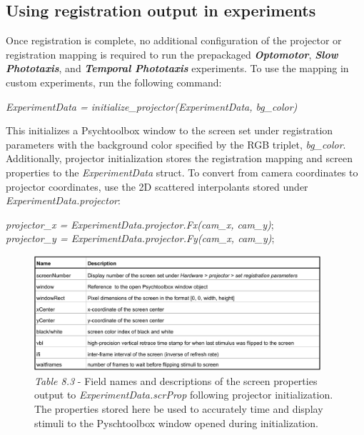 \documentclass[11pt]{article}
\begin{document}
\subsection{Using registration output in experiments}

Once registration is complete, no additional configuration of the projector or registration mapping is required to run the prepackaged \textit{\textbf{Optomotor}}, \textbf{\textit{Slow Phototaxis}}, and \textbf{\textit{Temporal Phototaxis}} experiments. To use the mapping in custom experiments, run the following command: 

\begin{center}
	\textit{\textit{ExperimentData} = initialize\_projector(\textit{ExperimentData}, bg\_color)}
\end{center}

This initializes a Psychtoolbox window to the screen set under registration parameters with the background color specified by the RGB triplet, \textit{bg\_color}. Additionally, projector initialization stores the registration mapping and screen properties to the \textit{\textit{ExperimentData}} struct. To convert from camera coordinates to projector coordinates, use the 2D scattered interpolants stored under \textit{\textit{ExperimentData}.projector}:

\begin{center}
	\textit{projector\_x = \textit{ExperimentData}.projector.Fx(cam\_x, cam\_y)};\\
	\textit{projector\_y = \textit{ExperimentData}.projector.Fy(cam\_x, cam\_y)};
\end{center}

\begin{figure}[h!]
	\begin{center}
		\includegraphics[width=0.95\textwidth]{images/projector/scrProps.pdf}
		\caption*{\footnotesize {\textit{Table 8.3} - Field names and descriptions of the screen properties output to \textit{\textit{ExperimentData}.scrProp} following projector initialization. The properties stored here be used to accurately time and display stimuli to the Pyschtoolbox window opened during initialization.}}
	\end{center}
\end{figure}
\end{document}
